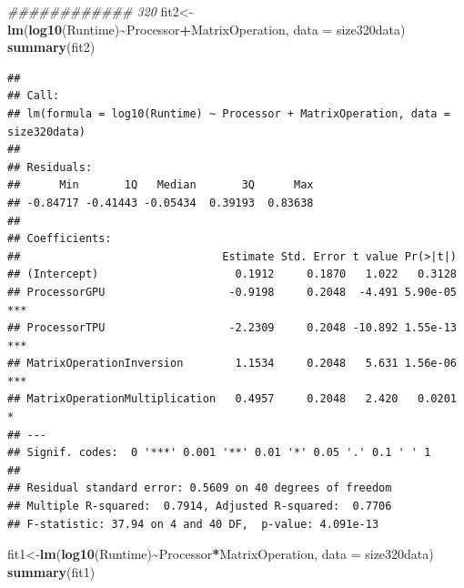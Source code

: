 \documentclass[
]{article}
\newenvironment{Shaded}{\begin{snugshade}}{\end{snugshade}}
\newcommand{\CommentTok}[1]{\textcolor[rgb]{0.56,0.35,0.01}{\textit{#1}}}
\newcommand{\DataTypeTok}[1]{\textcolor[rgb]{0.13,0.29,0.53}{#1}}
\newcommand{\KeywordTok}[1]{\textcolor[rgb]{0.13,0.29,0.53}{\textbf{#1}}}
\newcommand{\NormalTok}[1]{#1}
\newcommand{\OperatorTok}[1]{\textcolor[rgb]{0.81,0.36,0.00}{\textbf{#1}}}
\begin{document}
\begin{Shaded}
\begin{Highlighting}[]
\CommentTok{\#\#\#\#\#\#\#\#\#\#\#\# 320}
\NormalTok{fit2\textless{}{-}}\KeywordTok{lm}\NormalTok{(}\KeywordTok{log10}\NormalTok{(Runtime)}\OperatorTok{\textasciitilde{}}\NormalTok{Processor}\OperatorTok{+}\NormalTok{MatrixOperation, }\DataTypeTok{data =}\NormalTok{ size320data)}
\KeywordTok{summary}\NormalTok{(fit2)}
\end{Highlighting}
\end{Shaded}

\begin{verbatim}
## 
## Call:
## lm(formula = log10(Runtime) ~ Processor + MatrixOperation, data = size320data)
## 
## Residuals:
##      Min       1Q   Median       3Q      Max 
## -0.84717 -0.41443 -0.05434  0.39193  0.83638 
## 
## Coefficients:
##                               Estimate Std. Error t value Pr(>|t|)    
## (Intercept)                     0.1912     0.1870   1.022   0.3128    
## ProcessorGPU                   -0.9198     0.2048  -4.491 5.90e-05 ***
## ProcessorTPU                   -2.2309     0.2048 -10.892 1.55e-13 ***
## MatrixOperationInversion        1.1534     0.2048   5.631 1.56e-06 ***
## MatrixOperationMultiplication   0.4957     0.2048   2.420   0.0201 *  
## ---
## Signif. codes:  0 '***' 0.001 '**' 0.01 '*' 0.05 '.' 0.1 ' ' 1
## 
## Residual standard error: 0.5609 on 40 degrees of freedom
## Multiple R-squared:  0.7914, Adjusted R-squared:  0.7706 
## F-statistic: 37.94 on 4 and 40 DF,  p-value: 4.091e-13
\end{verbatim}

\begin{Shaded}
\begin{Highlighting}[]
\NormalTok{fit1\textless{}{-}}\KeywordTok{lm}\NormalTok{(}\KeywordTok{log10}\NormalTok{(Runtime)}\OperatorTok{\textasciitilde{}}\NormalTok{Processor}\OperatorTok{*}\NormalTok{MatrixOperation, }\DataTypeTok{data =}\NormalTok{ size320data)}
\KeywordTok{summary}\NormalTok{(fit1)}
\end{Highlighting}
\end{Shaded}
\end{document}
